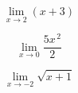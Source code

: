 \documentclass[10pt, twocolumn, landscape, a4paper]{article}
\begin{document}
$$
\lim_{x \to 2} (x + 3)
$$

$$
\lim_{x \to 0} \dfrac{5x^{\,2}}{2}
$$

$$
\lim_{x \to -2} \sqrt{x + 1}
$$
\end{document}
